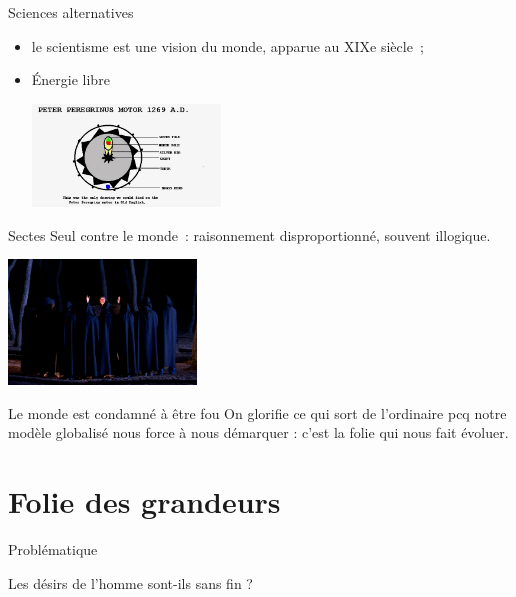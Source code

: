 \documentclass{beamer}
\begin{document}
\begin{frame}{Sciences alternatives}
	\begin{itemize}
	 \item le scientisme est une vision du monde, apparue au XIXe siècle~;
	 \item Énergie libre
		\begin{center}
			\includegraphics[width=5cm]{../Images/energie_libre.png}
		\end{center}

	\end{itemize}

\end{frame}


\begin{frame}{Sectes}
  Seul contre le monde~: raisonnement disproportionné, souvent illogique.
  \begin{center}
    \includegraphics[width=5cm]{../Images/secte.png}
  \end{center}
\end{frame}

\begin{frame}{Le monde est condamné à être fou}
  On glorifie ce qui sort de l'ordinaire pcq notre modèle globalisé nous force à nous démarquer : c'est la folie qui nous fait évoluer.

\end{frame}

\section{Folie des grandeurs}

\begin{frame}{Problématique}
  \begin{center}
    Les désirs de l'homme sont-ils sans fin ?
  \end{center}
\end{frame}
\end{document}
